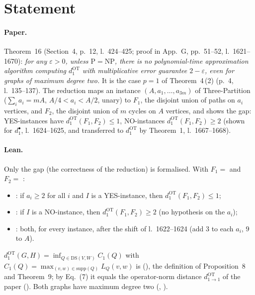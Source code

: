

\paperversion

\section{Statement}

\paragraph{Paper.} Theorem~16 (Section~4, p.~12, l.~424--425; proof in App.~G, pp.~51--52,
l.~1621--1670): \emph{for any $\varepsilon>0$, unless $\mathrm{P}=\mathrm{NP}$, there is no polynomial-time
approximation algorithm computing $d^{\mathrm{OT}}_1$ with multiplicative error guarantee $2-\varepsilon$, even
for graphs of maximum degree two.} It is the case $p=1$ of Theorem~4\,(2) (p.~4, l.~135--137). The reduction maps an
instance $(A,a_1,\dots,a_{3m})$ of Three-Partition ($\sum_ia_i=mA$, $A/4<a_i<A/2$, unary) to $F_1$, the
disjoint union of paths on $a_i$ vertices, and $F_2$, the disjoint union of $m$ cycles on $A$ vertices,
and shows the gap: YES-instances have $d^{\mathrm{OT}}_1(F_1,F_2)\le1$, NO-instances
$d^{\mathrm{OT}}_1(F_1,F_2)\ge2$ (shown for $d^{\bullet}_1$, l.~1624--1625, and transferred to
$d^{\mathrm{OT}}_1$ by Theorem~1, l.~1667--1668).

\paragraph{Lean.} Only the gap (the correctness of the reduction) is formalised. With
$F_1=$  and $F_2=$ :
\begin{itemize}
\item {}: if $a_i\ge2$ for all $i$ and $I$ is a
  YES-instance, then $d^{\mathrm{OT}}_1(F_1,F_2)\le1$;
\item {}: if $I$ is a NO-instance, then
  $d^{\mathrm{OT}}_1(F_1,F_2)\ge2$ (no hypothesis on the $a_i$);
\item {}: both, for every instance, after the shift
  of l.~1622--1624 (add $3$ to each $a_i$, $9$ to $A$).
\end{itemize}
$d^{\mathrm{OT}}_1(G,H)=\inf_{Q\in\mathrm{DS}(V,W)}C_1(Q)$ with $C_1(Q)=\max_{(v,w)\in\mathrm{supp}(Q)}L_Q(v,w)$
is  (), the definition of Proposition~8 and Theorem~9; by
Eq.~(7) it equals the operator-norm distance $d^{\mathrm{OT}}_{1\to1}$ of the paper
(). Both graphs have maximum degree two
(, ).

